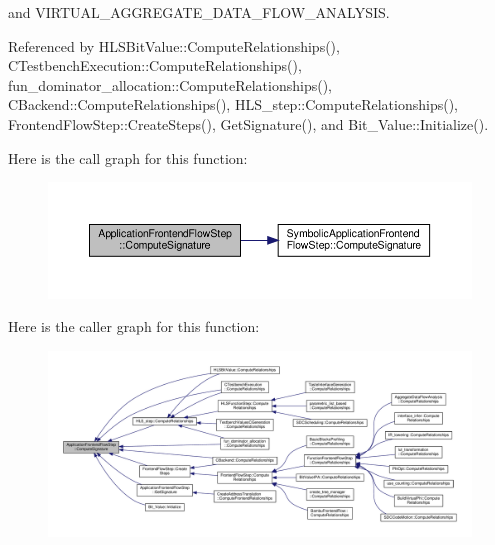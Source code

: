and V\+I\+R\+T\+U\+A\+L\+\_\+\+A\+G\+G\+R\+E\+G\+A\+T\+E\+\_\+\+D\+A\+T\+A\+\_\+\+F\+L\+O\+W\+\_\+\+A\+N\+A\+L\+Y\+S\+IS.



Referenced by H\+L\+S\+Bit\+Value\+::\+Compute\+Relationships(), C\+Testbench\+Execution\+::\+Compute\+Relationships(), fun\+\_\+dominator\+\_\+allocation\+::\+Compute\+Relationships(), C\+Backend\+::\+Compute\+Relationships(), H\+L\+S\+\_\+step\+::\+Compute\+Relationships(), Frontend\+Flow\+Step\+::\+Create\+Steps(), Get\+Signature(), and Bit\+\_\+\+Value\+::\+Initialize().

Here is the call graph for this function\+:
\nopagebreak
\begin{figure}[H]
\begin{center}
\leavevmode
\includegraphics[width=350pt]{d7/d7f/classApplicationFrontendFlowStep_a7f1afef6aec290f5a48b7a65716722be_cgraph}
\end{center}
\end{figure}
Here is the caller graph for this function\+:
\nopagebreak
\begin{figure}[H]
\begin{center}
\leavevmode
\includegraphics[width=350pt]{d7/d7f/classApplicationFrontendFlowStep_a7f1afef6aec290f5a48b7a65716722be_icgraph}
\end{center}
\end{figure}
\mbox{\label{classApplicationFrontendFlowStep_a2bf060a5ebc1735635dc5c7773387a25}} 
